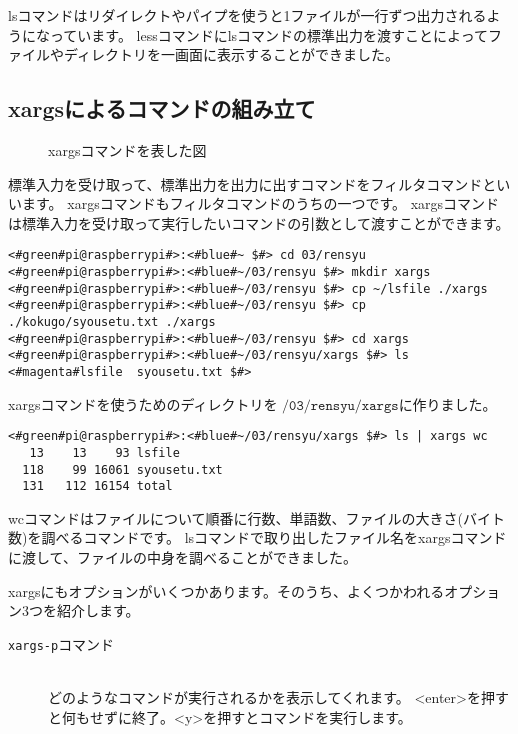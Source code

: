 lsコマンドはリダイレクトやパイプを使うと1ファイルが一行ずつ出力されるようになっています。
lessコマンドにlsコマンドの標準出力を渡すことによってファイルやディレクトリを一画面に表示することができました。




\subsection{xargsによるコマンドの組み立て}

\begin{figure}
    \centering
    
    \caption{xargsコマンドを表した図}
    \label{ch03:xargs_command}
\end{figure}

標準入力を受け取って、標準出力を出力に出すコマンドをフィルタコマンドといいます。
xargsコマンドもフィルタコマンドのうちの一つです。
xargsコマンドは標準入力を受け取って実行したいコマンドの引数として渡すことができます。

\begin{lstlisting}[caption=xargsコマンドを使う準備をする]
<#green#pi@raspberrypi#>:<#blue#~ $#> cd 03/rensyu
<#green#pi@raspberrypi#>:<#blue#~/03/rensyu $#> mkdir xargs
<#green#pi@raspberrypi#>:<#blue#~/03/rensyu $#> cp ~/lsfile ./xargs
<#green#pi@raspberrypi#>:<#blue#~/03/rensyu $#> cp ./kokugo/syousetu.txt ./xargs
<#green#pi@raspberrypi#>:<#blue#~/03/rensyu $#> cd xargs 
<#green#pi@raspberrypi#>:<#blue#~/03/rensyu/xargs $#> ls
<#magenta#lsfile  syousetu.txt $#>
\end{lstlisting}
xargsコマンドを使うためのディレクトリを$\texttt{~/03/rensyu/xargs}$に作りました。

\begin{lstlisting}[caption=xargsコマンドを使ってwcコマンドを使う]
<#green#pi@raspberrypi#>:<#blue#~/03/rensyu/xargs $#> ls | xargs wc
   13    13    93 lsfile
  118    99 16061 syousetu.txt
  131   112 16154 total
\end{lstlisting}
wcコマンドはファイルについて順番に行数、単語数、ファイルの大きさ(バイト数)を調べるコマンドです。
lsコマンドで取り出したファイル名をxargsコマンドに渡して、ファイルの中身を調べることができました。


xargsにもオプションがいくつかあります。そのうち、よくつかわれるオプション3つを紹介します。

\begin{description}
\item[\texttt{xargs}\textvisiblespace \texttt{-p}\textvisiblespace コマンド]\mbox{}\\
どのようなコマンドが実行されるかを表示してくれます。
<enter>を押すと何もせずに終了。<y>を押すとコマンドを実行します。
\end{description}

